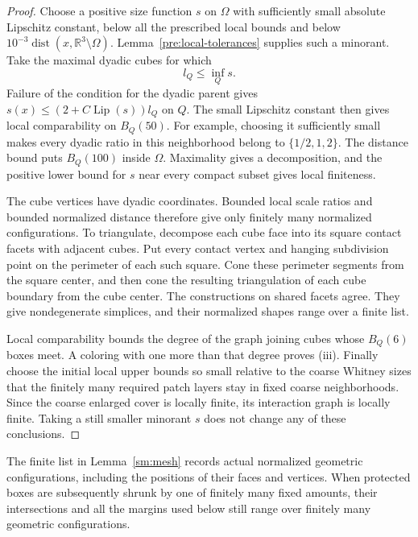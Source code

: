 \documentclass[11pt]{article}
\numberwithin{equation}{section}
\theoremstyle{definition}
\theoremstyle{remark}
\newcommand{\R}{\mathbb R}
\DeclareMathOperator{\Lip}{Lip}
\DeclareMathOperator{\dist}{dist}
\begin{document}
\begin{proof}
Choose a positive size function $s$ on $\Omega$ with sufficiently
small absolute Lipschitz constant, below all the prescribed local
bounds and below $10^{-3}\dist(x,\R^3\setminus\Omega)$.
Lemma~\ref{pre:local-tolerances} supplies such a minorant.  Take the
maximal dyadic cubes for which
\[
 l_Q\le\inf_Qs.
\]
Failure of the condition for the dyadic parent gives
$s(x)\le(2+C\Lip(s))l_Q$ on $Q$.  The small Lipschitz constant
then gives local comparability on $B_Q(50)$.  For example, choosing
it sufficiently small makes every dyadic ratio in this neighborhood
belong to $\{1/2,1,2\}$.  The distance bound puts $B_Q(100)$ inside
$\Omega$.  Maximality gives a decomposition, and the positive lower
bound for $s$ near every compact subset gives local finiteness.

The cube vertices have dyadic coordinates.  Bounded local scale
ratios and bounded normalized distance therefore give only finitely
many normalized configurations.  To triangulate, decompose each
cube face into its square contact facets with adjacent cubes.
Put every contact vertex and hanging subdivision point on the
perimeter of each such square.  Cone these perimeter segments from
the square center, and then cone the resulting triangulation of
each cube boundary from the cube center.  The constructions on
shared facets agree.  They give nondegenerate simplices, and their
normalized shapes range over a finite list.

Local comparability bounds the degree of the graph joining cubes
whose $B_Q(6)$ boxes meet.  A coloring with one more than that
degree proves \textup{(iii)}.  Finally choose the initial local
upper bounds so small relative to the coarse Whitney sizes that
the finitely many required patch layers stay in fixed coarse
neighborhoods.  Since the coarse enlarged cover is locally finite,
its interaction graph is locally finite.  Taking a still smaller
minorant $s$ does not change any of these conclusions.
\end{proof}

The finite list in Lemma~\ref{sm:mesh} records actual normalized
geometric configurations, including the positions of their faces and
vertices.  When protected boxes are subsequently shrunk by one of
finitely many fixed amounts, their intersections and all the margins
used below still range over finitely many geometric configurations.
\end{document}
